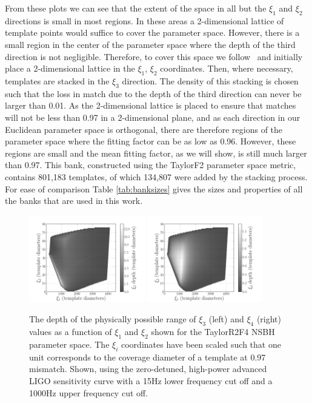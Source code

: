 From these plots we can see that the extent of the space in all but the $\xi_1$
and $\xi_2$ directions is small in most regions. In these areas a
2-dimensional lattice of template points would suffice to cover the parameter
space. However, there is a
small region in the center of the parameter space where the depth of the third
direction is not negligible. Therefore, to cover this space we
follow~\cite{Brown:2012qf} and initially place a 2-dimensional lattice in the
$\xi_1$, $\xi_2$ coordinates. Then, where necessary, templates are stacked in
the $\xi_3$ direction. The density of this stacking is chosen such that the loss
in match due to the depth of the third direction can never be larger than 0.01.
As the 2-dimensional lattice is placed to ensure that matches will not be less
than 0.97 in a 2-dimensional plane, and as each direction in our Euclidean 
parameter space is orthogonal, there are therefore regions of the parameter
space where the fitting factor can be as low as 0.96. However, these regions are
small and the mean fitting factor, as we will show, is still much larger than
0.97. This bank, constructed using the TaylorF2 parameter space metric, contains
801,183 templates, of which 134,807 were added by the stacking process. For
ease of comparison Table \ref{tab:banksizes} gives the sizes and properties of
all the banks that are used in this work.

\begin{figure}
    \centering
    \begin{minipage}[l]{\columnwidth}
    \centering
\includegraphics[width=0.45\textwidth]
{papers/nsbh_effectualness/figure2A.png}
\includegraphics[width=0.45\textwidth]
{papers/nsbh_effectualness/figure2B.png}
\caption{\label{fig:bankF4depths}
The depth of the
physically possible range of $\xi_3$ (left) and $\xi_4$ (right) values as a
function of
$\xi_1$ and $\xi_2$ shown for the TaylorR2F4 \ac{NSBH} parameter
space. The $\xi_i$ coordinates have been scaled
such that one unit corresponds to the coverage diameter of a template
at 0.97 mismatch. Shown, using the zero-detuned, high-power advanced LIGO
sensitivity curve with a 15Hz
lower frequency cut off and a 1000Hz upper frequency cut off.}
\end{minipage}
\end{figure}

